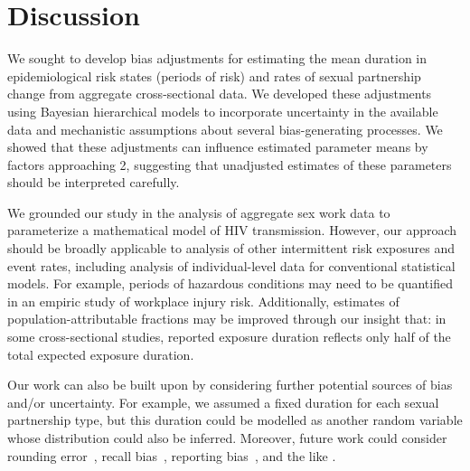 \section{Discussion}
We sought to develop bias adjustments for estimating
the mean duration in epidemiological risk states (periods of risk)
and rates of sexual partnership change
from aggregate cross-sectional data.
We developed these adjustments using Bayesian hierarchical models to incorporate
uncertainty in the available data and
mechanistic assumptions about several bias-generating processes.
We showed that these adjustments can influence
estimated parameter means by factors approaching 2,
suggesting that unadjusted estimates of these parameters
should be interpreted carefully.
\par
We grounded our study in the analysis of aggregate sex work data
to parameterize a mathematical model of HIV transmission.
However, our approach should be broadly applicable to
analysis of other intermittent risk exposures and event rates,
including analysis of individual-level data for conventional statistical models.
For example, periods of hazardous conditions may need to be quantified
in an empiric study of workplace injury risk.
Additionally, estimates of population-attributable fractions
may be improved through our insight that: in some cross-sectional studies,
reported exposure duration reflects only half of the total expected exposure duration.
\par
Our work can also be built upon by considering
further potential sources of bias and/or uncertainty.
For example, we assumed a fixed duration for each sexual partnership type,
but this duration could be modelled as another random variable
whose distribution could also be inferred.
Moreover, future work could consider
rounding error~\cite{Mills2014},
recall bias~\cite{Ramjee1999},
reporting bias~\cite{Lowndes2012},
and the like \cite{Fenton2001}.
